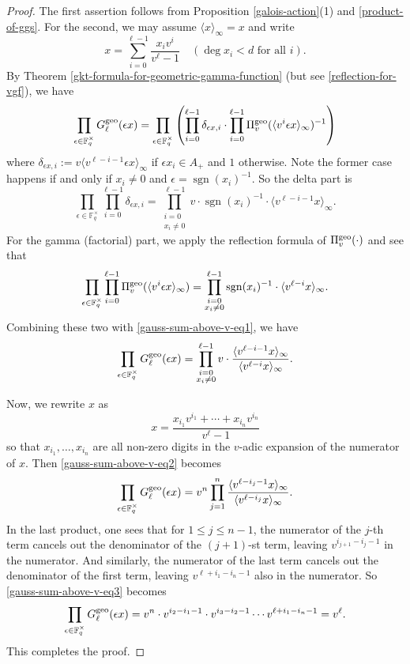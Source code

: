 \documentclass[11pt]{amsart}
\theoremstyle{plain}
\theoremstyle{definition}
\theoremstyle{remark}
\numberwithin{equation}{section}
\newcommand{\FF}{\mathbb{F}}
\newcommand{\sgn}{\operatorname{sgn}}
\newcommand{\anginf}[1]{\langle #1 \rangle_\infty}
\newcommand{\Fqst}{\FF_q^\times}
\newcommand{\vgf}{\Pi_v^{\textnormal{geo}}}
\newcommand{\ggs}{G_\l^{\textnormal{geo}}}
\let\l\ell
\begin{document}
	\begin{proof}
		The first assertion follows from Proposition \ref{galois-action}(1) and \eqref{product-of-ggs}.
		For the second, we may assume $\anginf{x} = x$ and write
		$$
		x = \sum_{i=0}^{\l-1} \frac{x_i v^i}{v^\l-1}
		\quad
		(\deg x_i < d \text{ for all } i).
		$$
		By Theorem \ref{gkt-formula-for-geometric-gamma-function} (but see \eqref{reflection-for-vgf}), we have
		\begin{equation}     \label{gauss-sum-above-v-eq1}
			\prod_{\epsilon \in \Fqst} \ggs (\epsilon x)
			= \prod_{\epsilon \in \Fqst} \left( \prod_{i=0}^{\l-1} \delta_{\epsilon x,i} \cdot  \prod_{i=0}^{\l-1} \vgf(\anginf{v^i \epsilon x})^{-1} \right)
		\end{equation}
		where $\delta_{\epsilon x,i} := v\anginf{v^{\l-i-1} \epsilon x}$ if $\epsilon x_i \in A_+$ and $1$ otherwise.
		Note the former case happens if and only if $x_i \neq 0$ and $\epsilon = \sgn( x_i)^{-1}$.
		So the delta part is
		$$
		\prod_{\epsilon \in \Fqst} \prod_{i=0}^{\l-1} \delta_{\epsilon x,i}
		= \prod_{\substack{i=0 \\ x_i \neq 0}}^{\l-1} v \cdot \sgn(x_i)^{-1} \cdot \anginf{v^{\l-i-1}x}.
		$$
		For the gamma (factorial) part, we apply the reflection formula of $\vgf(\cdot)$ \cite[Theorem 4.10.5]{thakur2004function} and see that
		$$
		\prod_{\epsilon \in \Fqst} \prod_{i=0}^{\l-1} \vgf(\anginf{v^i \epsilon x})
		= \prod_{\substack{i=0 \\ x_i \neq 0}}^{\l-1} \sgn(x_i)^{-1} \cdot \anginf{v^{\l-i}x}.
		$$
		Combining these two with \eqref{gauss-sum-above-v-eq1}, we have
		\begin{equation}   \label{gauss-sum-above-v-eq2}
			\prod_{\epsilon \in \Fqst} \ggs(\epsilon x)
			= \prod_{\substack{i=0 \\ x_i \neq 0}}^{\l-1} v \cdot \frac{\anginf{v^{\l-i-1}x}}{\anginf{v^{\l-i}x}}.
		\end{equation}
		
		Now, we rewrite $x$ as
		$$
		x = \frac{x_{i_1}v^{i_1} + \cdots + x_{i_n}v^{i_n}}{v^\l-1}
		$$
		so that $x_{i_1},\ldots,x_{i_n}$ are all non-zero digits in the $v$-adic expansion of the numerator of $x$.
		Then \eqref{gauss-sum-above-v-eq2} becomes
		\begin{equation}       \label{gauss-sum-above-v-eq3}
			\prod_{\epsilon \in \Fqst} \ggs(\epsilon x)
			= v^n \prod_{j=1}^n \frac{\anginf{v^{\l-i_j-1}x}}{\anginf{v^{\l-i_j}x}}.
		\end{equation}
		In the last product, one sees that for $1\leq j \leq n-1$, the numerator of the $j$-th term cancels out the denominator of the $(j+1)$-st term, leaving $v^{i_{j+1}-i_j-1}$ in the numerator.
		And similarly, the numerator of the last term cancels out the denominator of the first term, leaving $v^{\l+i_1-i_n-1}$ also in the numerator.
		So \eqref{gauss-sum-above-v-eq3} becomes
		$$
		\prod_{\epsilon \in \Fqst} \ggs(\epsilon x)
		= v^n \cdot v^{i_2-i_1-1} \cdot v^{i_3-i_2-1} \cdots v^{\l + i_1 - i_n - 1}
		= v^\l.
		$$
		This completes the proof.
	\end{proof}
	
\end{document}
